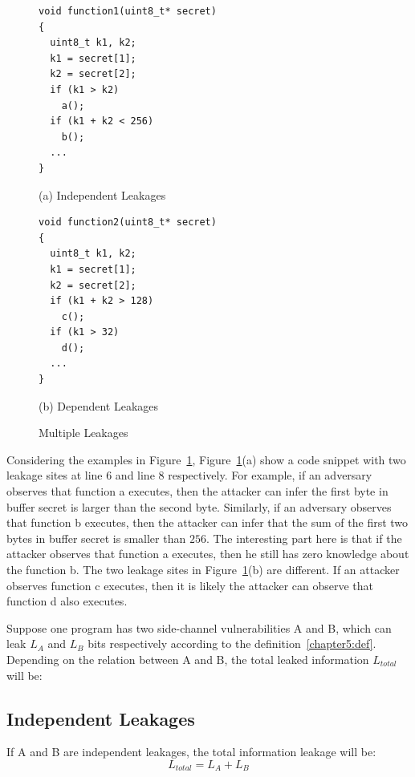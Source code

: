 \begin{figure}[h]
\begin{minipage}{0.4\linewidth}
\begin{lstlisting}
void function1(uint8_t* secret)
{
  uint8_t k1, k2;
  k1 = secret[1];
  k2 = secret[2];
  if (k1 > k2)
    a();
  if (k1 + k2 < 256)
    b();
  ...
}
\end{lstlisting}\caption*{(a) Independent Leakages}
\end{minipage}
\hfill
\begin{minipage}{0.4\linewidth}
\begin{lstlisting}
void function2(uint8_t* secret)
{
  uint8_t k1, k2;
  k1 = secret[1];
  k2 = secret[2];
  if (k1 + k2 > 128)
    c();
  if (k1 > 32)
    d();
  ...
}
\end{lstlisting} \caption*{(b) Dependent Leakages}
\end{minipage}
\caption{Multiple Leakages}\label{chapter5:fig:multiple}
\end{figure}

Considering the examples in Figure~\ref{chapter5:fig:multiple}, Figure~\ref{chapter5:fig:multiple}(a) show a code snippet with two leakage sites at line 6 and line 8 respectively. For example, if an adversary observes that function \textsf{a} executes, then the attacker can infer the first byte in buffer \textsf{secret} is larger than the second byte.  Similarly, if an adversary observes that function \textsf{b} executes, then the attacker can infer that the sum of the first two bytes in buffer \textsf{secret} is smaller than $256$. The interesting part here is that if the attacker observes that function \textsf{a} executes, then he still has zero knowledge about the function \textsf{b}. The two leakage sites in Figure~\ref{chapter5:fig:multiple}(b) are different. If an attacker observes function \textsf{c} executes, then it is likely the attacker can observe that function \textsf{d} also executes. 

Suppose one program has two side-channel vulnerabilities A and B, which can leak $L_A$ and $L_B$ bits respectively according to the definition~\ref{chapter5:def}. 
Depending on the relation between A and B, the total leaked information $L_{\mathit{total}}$ will be:

\subsection{Independent Leakages}
If A and B are independent leakages, the total information leakage will be:
\[L_{\mathit{total}} = L_A + L_B \]

